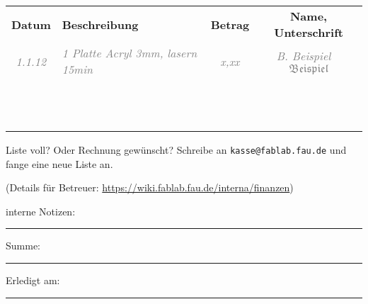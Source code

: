 \documentclass{\basedir fablab-document}
\newcommand{\thickhline}{\noalign{\hrule height 2pt}}
\begin{document}
\newcommand{\bsp}[1]{\textcolor{gray}{\itshape #1}}
\newcommand{\beispielzeile}[5]{\bsp{#2} & \bsp{#3} & \bsp{#4} & \bsp{#5} \\ \hline}
\newcommand{\leerzeile}{\vbox{\vspace{2.4em}} & & & \\ \hline}
\vspace{-.4em}
\begin{tabularx}{\textwidth}{|c|X|c|c|} \hline
\bfseries Datum      &  \bfseries Beschreibung  & \bfseries Betrag & \bfseries Name, Unterschrift \\\thickhline
\beispielzeile{BSP}{1.1.12}{1 Platte Acryl 3mm, lasern 15min}{x,xx}{B. Beispiel ~ $\mathfrak{Beispiel}$}
\leerzeile
\leerzeile
\leerzeile
\leerzeile
\leerzeile
\leerzeile
\leerzeile
\leerzeile
\leerzeile
\leerzeile
\leerzeile
\leerzeile
\end{tabularx}

Liste voll? Oder Rechnung gewünscht? Schreibe an \texttt{kasse@fablab.fau.de} und fange eine neue Liste an.

{\color{gray} \small(Details für Betreuer: \url{https://wiki.fablab.fau.de/interna/finanzen})}

interne Notizen:  \rule{3cm}{0.4pt}\hspace{1cm} Summe:  \rule{2cm}{0.4pt} \hspace{1cm} Erledigt am:  \rule{4cm}{0.4pt} 
\end{document}
